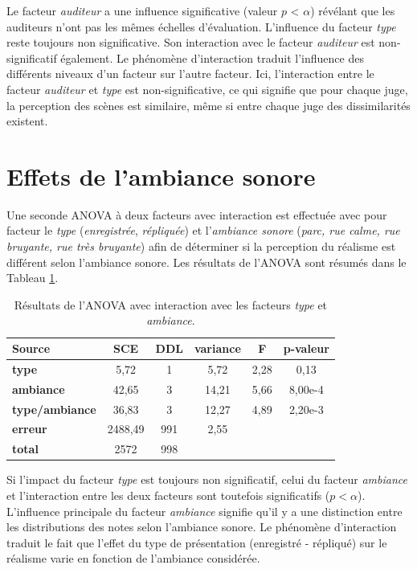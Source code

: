 Le facteur \textit{auditeur} a une influence significative (valeur $p$ < $\alpha$) révélant que les auditeurs n'ont pas les mêmes échelles d'évaluation. L'influence du facteur \textit{type} reste toujours non significative. Son interaction avec le facteur \textit{auditeur} est non-significatif également.
Le phénomène d'interaction traduit l'influence des différents niveaux d'un facteur sur l'autre facteur. Ici, l'interaction entre le facteur \textit{auditeur} et \textit{type} est non-significative, ce qui signifie que pour chaque juge, la perception des scènes est similaire, même si entre chaque juge des dissimilarités existent.

\section{Effets de l'ambiance sonore}

Une seconde ANOVA à deux facteurs avec interaction est effectuée avec pour facteur le \textit{type} (\textit{enregistrée}, \textit{répliquée}) et l'\textit{ambiance sonore} (\textit{parc, rue calme, rue bruyante, rue très bruyante}) afin de déterminer si la perception du réalisme est différent selon l'ambiance sonore. Les résultats de l'ANOVA sont résumés dans le Tableau \ref{tab:anova_ambiance}.

\begin{table}[ht]
\centering
\begin{tabular}{lccccc}
\hline
\textbf{Source}     & \textbf{SCE} & \textbf{DDL} & \textbf{variance} & \textbf{F} & \textbf{p-valeur} \\
\hline
\textbf{type} & 5,72 & 1 & 5,72 & 2,28 & 0,13 \\
\hline
\textbf{ambiance} & 42,65 & 3 & 14,21 & 5,66 & 8,00e-4 \\
\hline
\textbf{type/ambiance} & 36,83 & 3 & 12,27 & 4,89 & 2,20e-3 \\
\hline
\textbf{erreur}      & 2488,49 & 991 & 2,55 & &  \\
\hline
\textbf{total}      & 2572 & 998 & & & \\
\hline
\end{tabular}
\caption{Résultats de l'ANOVA avec interaction avec les facteurs \textit{type} et \textit{ambiance}.}
\label{tab:anova_ambiance}
\end{table}


Si l'impact du facteur \textit{type} est toujours non significatif, celui du facteur \textit{ambiance} et l'interaction entre les deux facteurs sont toutefois significatifs ($p < \alpha$). L'influence principale du facteur \textit{ambiance} signifie qu'il y a une distinction entre les distributions des notes selon l'ambiance sonore. Le phénomène d'interaction traduit le fait que l'effet du type de présentation (enregistré - répliqué) sur le réalisme varie en fonction de l'ambiance considérée.

